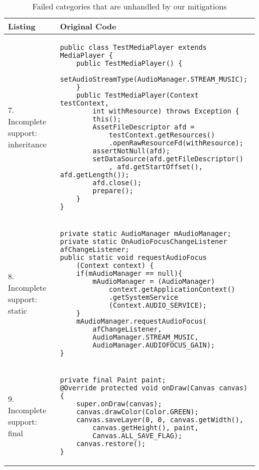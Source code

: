 \begin{table}
	\caption{Failed categories that are unhandled by our mitigations}\label{tab:mitigatefail}
\centering
\begin{tabular}{|p{}|p{}|}
\hline
\textbf{Listing}
  &
  \textbf{Original Code}
 \\ \hline
7. Incomplete support: inheritance
&
\begin{lstlisting}
public class TestMediaPlayer extends MediaPlayer {
    public TestMediaPlayer() {
        setAudioStreamType(AudioManager.STREAM_MUSIC);
    }
    public TestMediaPlayer(Context testContext, 
        int withResource) throws Exception {
        this();
        AssetFileDescriptor afd = 
            testContext.getResources()
            .openRawResourceFd(withResource);
        assertNotNull(afd);
        setDataSource(afd.getFileDescriptor()
            , afd.getStartOffset(), afd.getLength());
        afd.close();
        prepare();
    }
}
\end{lstlisting}
\\ \hline
8. Incomplete support: static
&
\begin{lstlisting}
private static AudioManager mAudioManager;
private static OnAudioFocusChangeListener afChangeListener;
public static void requestAudioFocus
    (Context context) {
    if(mAudioManager == null){
        mAudioManager = (AudioManager) 
            context.getApplicationContext()
            .getSystemService
            (Context.AUDIO_SERVICE);
    }
    mAudioManager.requestAudioFocus(
        afChangeListener,
        AudioManager.STREAM_MUSIC,
        AudioManager.AUDIOFOCUS_GAIN);
}
\end{lstlisting}
\\ \hline
9. Incomplete support: final
&
\begin{lstlisting}
private final Paint paint;
@Override protected void onDraw(Canvas canvas) {
    super.onDraw(canvas);
    canvas.drawColor(Color.GREEN);
    canvas.saveLayer(0, 0, canvas.getWidth(),
        canvas.getHeight(), paint, 
        Canvas.ALL_SAVE_FLAG);
    canvas.restore();
}
\end{lstlisting}
\\ \hline
 \end{tabular}
 \end{table}

